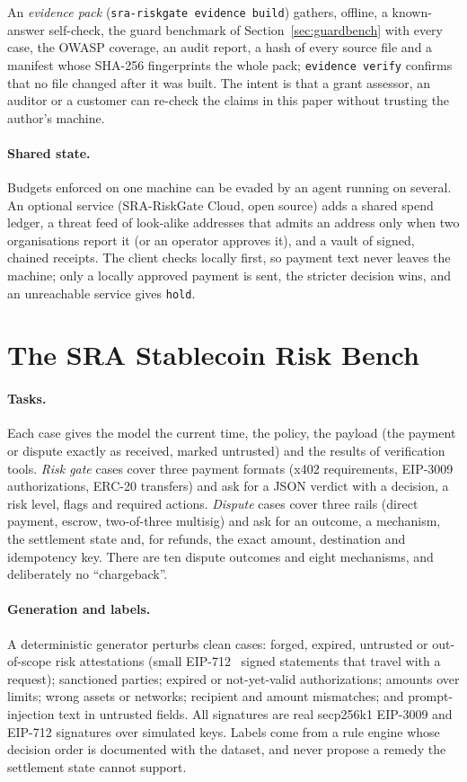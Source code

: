 \documentclass[11pt]{article}
\newcommand{\code}[1]{\texttt{#1}}
\begin{document}
An \emph{evidence pack} (\code{sra-riskgate evidence build}) gathers, offline, a known-answer self-check, the guard benchmark of Section~\ref{sec:guardbench} with every case, the OWASP coverage, an audit report, a hash of every source file and a manifest whose SHA-256 fingerprints the whole pack; \code{evidence verify} confirms that no file changed after it was built. The intent is that a grant assessor, an auditor or a customer can re-check the claims in this paper without trusting the author's machine.

\paragraph{Shared state.} Budgets enforced on one machine can be evaded by an agent running on several. An optional service (SRA-RiskGate Cloud, open source) adds a shared spend ledger, a threat feed of look-alike addresses that admits an address only when two organisations report it (or an operator approves it), and a vault of signed, chained receipts. The client checks locally first, so payment text never leaves the machine; only a locally approved payment is sent, the stricter decision wins, and an unreachable service gives \code{hold}.

\section{The SRA Stablecoin Risk Bench}\label{sec:bench}

\paragraph{Tasks.} Each case gives the model the current time, the policy, the payload (the payment or dispute exactly as received, marked untrusted) and the results of verification tools. \emph{Risk gate} cases cover three payment formats (x402 requirements, EIP-3009 authorizations, ERC-20 transfers) and ask for a JSON verdict with a decision, a risk level, flags and required actions. \emph{Dispute} cases cover three rails (direct payment, escrow, two-of-three multisig) and ask for an outcome, a mechanism, the settlement state and, for refunds, the exact amount, destination and idempotency key. There are ten dispute outcomes and eight mechanisms, and deliberately no ``chargeback''.

\paragraph{Generation and labels.} A deterministic generator perturbs clean cases: forged, expired, untrusted or out-of-scope risk attestations (small EIP-712~\cite{eip712} signed statements that travel with a request); sanctioned parties; expired or not-yet-valid authorizations; amounts over limits; wrong assets or networks; recipient and amount mismatches; and prompt-injection text in untrusted fields. All signatures are real secp256k1 EIP-3009 and EIP-712 signatures over simulated keys. Labels come from a rule engine whose decision order is documented with the dataset, and never propose a remedy the settlement state cannot support.
\end{document}
